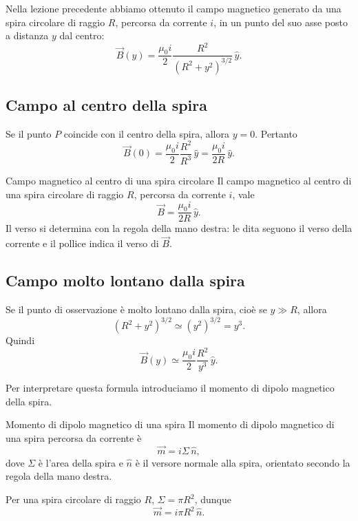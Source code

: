 \documentclass[a4paper]{article}
\begin{document}
Nella lezione precedente abbiamo ottenuto il campo magnetico generato da una spira circolare di raggio \(R\), percorsa da corrente \(i\), in un punto del suo asse posto a distanza \(y\) dal centro:
\[
    \vec{B}(y)=\frac{\mu_0 i}{2}\frac{R^2}{\left(R^2+y^2\right)^{3/2}}\,\hat{y}.
\]

\begin{center}
\end{center}

\subsection{Campo al centro della spira}

Se il punto \(P\) coincide con il centro della spira, allora \(y=0\). Pertanto
\[
    \vec{B}(0)=\frac{\mu_0 i}{2}\frac{R^2}{R^3}\,\hat{y}
    =\frac{\mu_0 i}{2R}\,\hat{y}.
\]

\begin{snippetproposition}{Campo magnetico al centro di una spira circolare}
    Il campo magnetico al centro di una spira circolare di raggio \(R\), percorsa da corrente \(i\), vale
    \[
        \vec{B}=\frac{\mu_0 i}{2R}\,\hat{y}.
    \]
    Il verso si determina con la regola della mano destra: le dita seguono il verso della corrente e il pollice indica il verso di \(\vec{B}\).
\end{snippetproposition}

\subsection{Campo molto lontano dalla spira}

Se il punto di osservazione è molto lontano dalla spira, cioè se \(y\gg R\), allora
\[
    \left(R^2+y^2\right)^{3/2}\simeq \left(y^2\right)^{3/2}=y^3.
\]
Quindi
\[
    \vec{B}(y)\simeq \frac{\mu_0 i}{2}\frac{R^2}{y^3}\,\hat{y}.
\]

Per interpretare questa formula introduciamo il momento di dipolo magnetico della spira.

\begin{snippetdefinition}{Momento di dipolo magnetico di una spira}
    Il momento di dipolo magnetico di una spira percorsa da corrente è
    \[
        \vec{m}=i\Sigma\,\hat{n},
    \]
    dove \(\Sigma\) è l'area della spira e \(\hat{n}\) è il versore normale alla spira, orientato secondo la regola della mano destra.

    Per una spira circolare di raggio \(R\), \(\Sigma=\pi R^2\), dunque
    \[
        \vec{m}=i\pi R^2\,\hat{n}.
    \]
\end{snippetdefinition}
\end{document}

